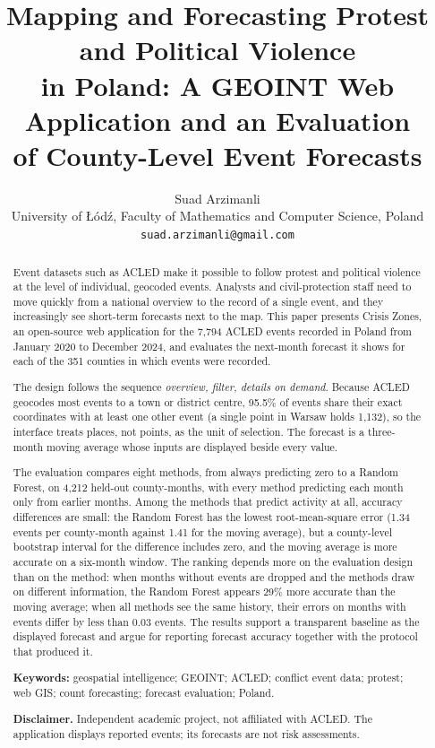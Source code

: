 \documentclass[11pt,a4paper]{article}
\title{Mapping and Forecasting Protest and Political Violence\\ in Poland:
       A GEOINT Web Application and an Evaluation\\ of County-Level Event Forecasts}
\author{Suad Arzimanli\\[2pt]
        \small University of \L{}ód\'{z}, Faculty of Mathematics and Computer Science, Poland\\
        \small \texttt{suad.arzimanli@gmail.com}}
\date{}
\newcommand{\appname}{Crisis Zones}
\begin{document}
\maketitle

\begin{abstract}
Event datasets such as ACLED make it possible to follow protest and political violence at the level of individual, geocoded events. Analysts and civil-protection staff need to move quickly from a national overview to the record of a single event, and they increasingly see short-term forecasts next to the map. This paper presents \appname{}, an open-source web application for the 7{,}794 ACLED events recorded in Poland from January 2020 to December 2024, and evaluates the next-month forecast it shows for each of the 351 counties in which events were recorded.

The design follows the sequence \emph{overview, filter, details on demand}. Because ACLED geocodes most events to a town or district centre, 95.5\% of events share their exact coordinates with at least one other event (a single point in Warsaw holds 1{,}132), so the interface treats places, not points, as the unit of selection. The forecast is a three-month moving average whose inputs are displayed beside every value.

The evaluation compares eight methods, from always predicting zero to a Random Forest, on 4{,}212 held-out county-months, with every method predicting each month only from earlier months. Among the methods that predict activity at all, accuracy differences are small: the Random Forest has the lowest root-mean-square error (1.34 events per county-month against 1.41 for the moving average), but a county-level bootstrap interval for the difference includes zero, and the moving average is more accurate on a six-month window. The ranking depends more on the evaluation design than on the method: when months without events are dropped and the methods draw on different information, the Random Forest appears 29\% more accurate than the moving average; when all methods see the same history, their errors on months with events differ by less than 0.03 events. The results support a transparent baseline as the displayed forecast and argue for reporting forecast accuracy together with the protocol that produced it.

\medskip
\noindent\textbf{Keywords:} geospatial intelligence; GEOINT; ACLED; conflict event data; protest; web GIS; count forecasting; forecast evaluation; Poland.

\smallskip
\noindent\textbf{Disclaimer.} Independent academic project, not affiliated with ACLED. The application displays reported events; its forecasts are not risk assessments.
\end{abstract}
\end{document}

